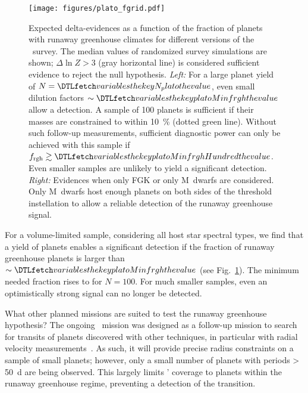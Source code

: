 \documentclass[modern]{aastex631}
\begin{document}
    \begin{figure*}[ht!]
        \begin{centering}
            \texttt{[image: figures/plato\_fgrid.pdf]}
            \caption{
            Expected delta-evidences as a function of the fraction of planets with runaway greenhouse climates for different versions of the \plato\ survey.
            The median values of randomized survey simulations are shown; $\Delta \ln Z > 3$ (gray horizontal line) is considered sufficient evidence to reject the null hypothesis.
            \textit{Left:} For a large planet yield of $N = \var{N_plato}$, even small dilution factors $\sim \var{platoMinfrgh}$ allow a detection.
                A sample of 100 planets is sufficient if their masses are constrained to within \SI{10}{\percent} (dotted green line).
                Without such follow-up measurements, sufficient diagnostic power can only be achieved with this sample if $f_\mathrm{rgh} \gtrsim \var{platoMinfrghHundred}$.
               Even smaller samples are unlikely to yield a significant detection.
            \textit{Right:} Evidences when only FGK or only M~dwarfs are considered.
                Only M~dwarfs host enough planets on both sides of the threshold instellation to allow a reliable detection of the runaway greenhouse signal.
            }
            \label{fig:plato_fgrid}
        \end{centering}
    \end{figure*}

For a volume-limited sample, considering all host star spectral types, we find that a yield of  planets enables a significant detection if the fraction of runaway greenhouse planets is larger than $\sim \var{platoMinfrgh}$ (see Fig.~\ref{fig:plato_fgrid}).
The minimum needed fraction rises to  for $N = 100$.
For much smaller samples, even an optimistically strong signal can no longer be detected.

What other planned missions are suited to test the runaway greenhouse hypothesis?
The ongoing \cheops\ mission was designed as a follow-up mission to search for transits of planets discovered with other techniques, in particular with radial velocity measurements~\citep{Benz2021}.
As such, it will provide precise radius constraints on a sample of small planets; however, only a small number of planets with periods \SI{> 50}{\day} are being observed.
This largely limits \cheops' coverage to planets within the runaway greenhouse regime, preventing a detection of the transition.
\end{document}
